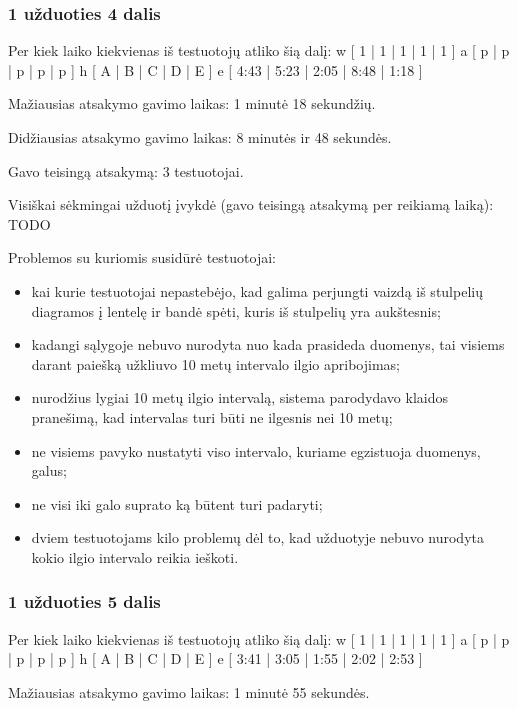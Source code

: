 \subsubsection{1 užduoties 4 dalis}

Per kiek laiko kiekvienas iš testuotojų atliko šią dalį:
\xtable
{
  w [ 1 | 1 | 1 | 1 | 1 ]
  a [ p | p | p | p | p ]
  h [ A | B | C | D | E ]
  e [ 4:43 | 5:23 | 2:05 | 8:48 | 1:18 ]
}

Mažiausias atsakymo gavimo laikas: 1 minutė 18 sekundžių.

Didžiausias atsakymo gavimo laikas: 8 minutės ir 48 sekundės.

Gavo teisingą atsakymą: 3 testuotojai.

Visiškai sėkmingai užduotį įvykdė (gavo teisingą atsakymą per reikiamą 
laiką): TODO

Problemos su kuriomis susidūrė testuotojai:
\begin{itemize}
  \item kai kurie testuotojai nepastebėjo, kad galima perjungti vaizdą
    iš stulpelių diagramos į lentelę ir bandė spėti, kuris iš stulpelių
    yra aukštesnis;
  \item kadangi sąlygoje nebuvo nurodyta nuo kada prasideda duomenys,
    tai visiems darant paiešką užkliuvo 10 metų intervalo ilgio
    apribojimas;
  \item nurodžius lygiai 10 metų ilgio intervalą, sistema parodydavo
    klaidos pranešimą, kad intervalas turi būti ne ilgesnis nei 10 metų;
  \item ne visiems pavyko nustatyti viso intervalo, kuriame egzistuoja
    duomenys, galus;
  \item ne visi iki galo suprato ką būtent turi padaryti;
  \item dviem testuotojams kilo problemų dėl to, kad užduotyje nebuvo
    nurodyta kokio ilgio intervalo reikia ieškoti.
\end{itemize}

\subsubsection{1 užduoties 5 dalis}

Per kiek laiko kiekvienas iš testuotojų atliko šią dalį:
\xtable
{
  w [ 1 | 1 | 1 | 1 | 1 ]
  a [ p | p | p | p | p ]
  h [ A | B | C | D | E ]
  e [ 3:41 | 3:05 | 1:55 | 2:02 | 2:53 ]
}

Mažiausias atsakymo gavimo laikas: 1 minutė 55 sekundės.

